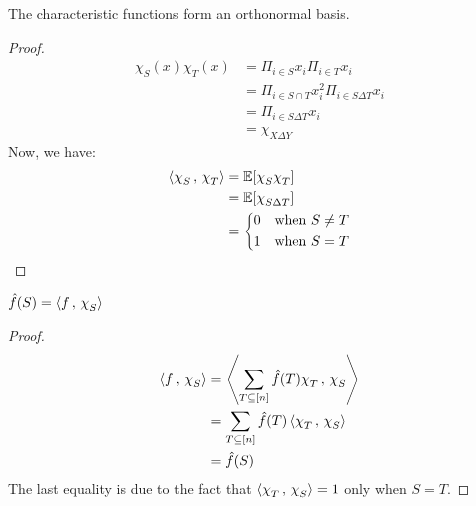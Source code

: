 \begin{theorem}
    The characteristic functions form an orthonormal basis.

    \begin{proof}
        \begin{align*}
            \chi_S(x)\chi_T(x)  &= \Pi_{i \in S}x_i\Pi_{i \in T}x_i \\
                                &= \Pi_{i \in S\cap T} x_i^2 \Pi_{i \in S \Delta T} x_i\\
                                &= \Pi_{i \in S \Delta T} x_i\\
                                &= \chi_{X\Delta Y} 
        \end{align*}
        Now, we have:
        \begin{align*}
            \inn{\chi_S}{\chi_T}  &= \E[\chi_S\chi_T]\\
                            &= \E[\chi_{S\Delta T}]\\
                            &= \begin{dcases}
                                0 &\text{when $S \neq T$}\\
                                1 &\text{when $S = T$}
                            \end{dcases}
        \end{align*}    
    \end{proof}
\end{theorem}

\begin{lemma}
    $\fhat(S) = \inn{f}{\chi_S}$

    \begin{proof}
        \begin{align*}
            \inn{f}{\chi_S} &= \inn{\sum_{T \subseteq [n]} \fhat(T)\chi_T}{\chi_S}\\
                            &=\sum_{T \subseteq [n]} \fhat(T)\inn{\chi_T}{\chi_S}\\
                            &=\fhat(S)
        \end{align*}    
        The last equality is due to the fact that $\inn{\chi_T}{\chi_S} = 1$ only when $S = T$.
    \end{proof}
\end{lemma}



